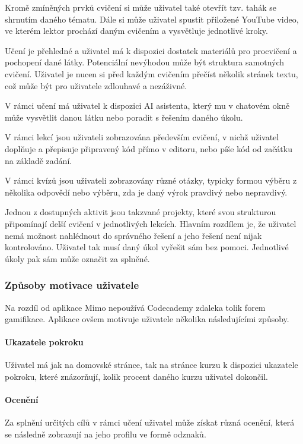 Kromě zmíněných prvků cvičení si může uživatel také otevřít tzv. tahák se shrnutím daného tématu. Dále si může uživatel spustit přiložené YouTube video, ve kterém lektor prochází daným cvičením a vysvětluje jednotlivé kroky.

Učení je přehledné a uživatel má k dispozici dostatek materiálů pro procvičení a pochopení dané látky. Potenciální nevýhodou může být struktura samotných cvičení. Uživatel je nucen si před každým cvičením přečíst několik stránek textu, což může být pro uživatele zdlouhavé a nezáživné.

V rámci učení má uživatel k dispozici AI asistenta, který mu v chatovém okně může vysvětlit danou látku nebo poradit s řešením daného úkolu.

V rámci lekcí jsou uživateli zobrazována především cvičení, v nichž uživatel doplňuje a přepisuje připravený kód přímo v editoru, nebo píše kód od začátku na základě zadání.

V rámci kvízů jsou uživateli zobrazovány různé otázky, typicky formou výběru z několika odpovědí nebo výběru, zda je daný výrok pravdivý nebo nepravdivý.

Jednou z dostupných aktivit jsou takzvané projekty, které svou strukturou připomínají delší cvičení v jednotlivých lekcích. Hlavním rozdílem je, že uživatel nemá možnost nahlédnout do správného řešení a jeho řešení není nijak kontrolováno. Uživatel tak musí daný úkol vyřešit sám bez pomoci. Jednotlivé úkoly pak sám může označit za splněné.  

\subsubsection{Způsoby motivace uživatele}

Na rozdíl od aplikace Mimo nepoužívá Codecademy zdaleka tolik forem gamifikace. Aplikace ovšem motivuje uživatele několika následujícími způsoby.

\paragraph{Ukazatele pokroku} Uživatel má jak na domovské stránce, tak na stránce kurzu k dispozici ukazatele pokroku, které znázorňují, kolik procent daného kurzu uživatel dokončil. 

\paragraph{Ocenění} Za splnění určitých cílů v rámci učení uživatel může získat různá ocenění, která se následně zobrazují na jeho profilu ve formě odznaků.

